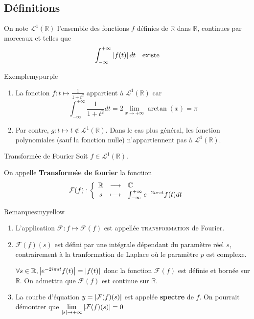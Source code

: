 \subsection{Définitions}

    On note $\mathcal{L}^1(\mathbb{R})$ l’ensemble des fonctions $f$ définies de $\mathbb{R}$ dans $\mathbb{R}$, continues par morceaux et telles que 
    \[ \int_{-\infty}^{+\infty} \left\lvert f(t)\right\rvert dt \quad \text{existe} \] 

    \begin{omed}{Exemple}{mypurple}
        \begin{enumerate}
            \item La fonction $f : t \mapsto \frac{1}{1 + t^2}$ appartient à $\mathcal{L}^1(\mathbb{R})$ car 
            \[ \int_{-\infty}^{+\infty} \frac{1}{1+ t^2}dt = 2 \lim\limits_{x \rightarrow + \infty} \arctan(x) = \pi \]
            \item Par contre, $g : t \mapsto t \notin \mathcal{L}^1(\mathbb{R})$. Dans le cas plus général, les fonction polynomiales (sauf la fonction nulle) n’appartiennent pas à $\mathcal{L}^1(\mathbb{R})$.
        \end{enumerate}
    \end{omed}

    \begin{defi}{Transformée de Fourier}{}
        Soit $f \in \mathcal{L}^1(\mathbb{R})$.
        
        On appelle \textbf{Transformée de fourier} la fonction 
        \[ \fonction{\mathcal{F}(f)}{\mathbb{R}}{\mathbb{C}}{s}{\int_{-\infty}^{+\infty} e^{-2i \pi st}f(t)dt} \]
    \end{defi}

    \begin{omed}{Remarques}{myyellow}
        \begin{enumerate}
            \item L’application $\mathcal{F} : f \mapsto \mathcal{F}(f)$ est appellée \textsc{transformation} de Fourier.
            \item $\mathcal{F}(f)(s)$ est défini par une intégrale dépendant du paramètre réel $s$, contrairement à la tranformation de Laplace où le paramètre $p$ est complexe.
            
            $\forall s \in \mathbb{R}, \left\lvert e^{-2i\pi st}f(t)\right\rvert = \left\lvert f(t)\right\rvert$ donc la fonction $\mathcal{F}(f)$ est définie et bornée sur $\mathbb{R}$. On admettra que $\mathcal{F}(f)$ est continue sur $\mathbb{R}$.
            \item La courbe d’équation $y = \left\lvert \mathcal{F}(f)(s)\right\rvert$ est appelée \textbf{spectre} de $f$. On pourrait démontrer que $\lim\limits_{\left\lvert s\right\rvert \rightarrow +\infty} \left\lvert \mathcal{F}(f)(s)\right\rvert = 0$
        \end{enumerate}
    \end{omed}

